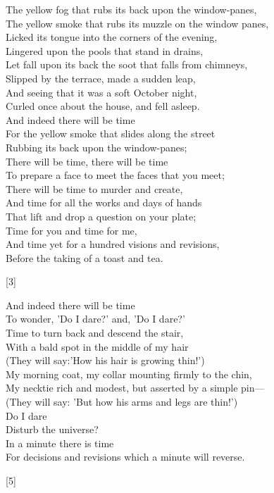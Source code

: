 \documentclass{article}
\begin{document}
\begin{minipage}{10cm}
    The yellow fog that rubs its back upon the window-panes,\\
    The yellow smoke that rubs its muzzle on the window panes,\\
    Licked its tongue into the corners of the evening,\\
    Lingered upon the pools that stand in drains,\\
    Let fall upon its back the soot that falls from chimneys,\\
    Slipped by the terrace, made a sudden leap,\\
    And seeing that it was a soft October night,\\
    Curled once about the house, and fell asleep.\\
    And indeed there will be time\\
    For the yellow smoke that slides along the street\\
    Rubbing its back upon the window-panes;\\
    There will be time, there will be time\\
    To prepare a face to meet the faces that you meet;\\
    There will be time to murder and create,\\
    And time for all the works and days of hands\\
    That lift and drop a question on your plate;\\
    Time for you and time for me,\\
    And time yet for a hundred visions and revisions,\\
    Before the taking of a toast and tea.
    \begin{center}[3]\end{center}
\end{minipage}

\begin{minipage}{10cm}
    And indeed there will be time\\
    To wonder, 'Do I dare?' and, 'Do I dare?'\\
    Time to turn back and descend the stair,\\
    With a bald spot in the middle of my hair\\
    (They will say:'How his hair is growing thin!')\\
    My morning coat, my collar mounting firmly to the chin,\\
    My necktie rich and modest, but asserted by a simple pin---\\
    (They will say: 'But how his arms and legs are thin!')\\
    Do I dare\\
    Disturb the universe?\\
    In a minute there is time\\
    For decisions and revisions which a minute will reverse.
    \begin{center}[5]\end{center}
\end{minipage}
\end{document}
